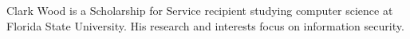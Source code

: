 \documentclass[11pt,expanded,copyright]{fsuthesis}
\begin{document}
%
%

%





% 
% 

\begin{biosketch}
Clark Wood is a Scholarship for Service recipient studying computer science at Florida State University. His research and interests focus on information security.
\end{biosketch}
\end{document}
